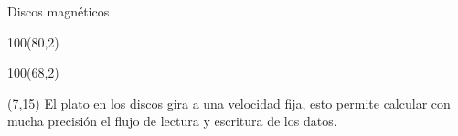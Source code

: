 \documentclass[aspectratio=169]{beamer}
\begin{document}
\begin{frame}{Discos magnéticos}
    \begin{textblock}{100}(80,2)
    \end{textblock}
    \begin{textblock}{100}(68,2)
    \end{textblock}
    \begin{textblock}{70}(7,15)
    \small
    El plato en los discos gira a una velocidad fija, esto permite calcular con mucha precisión el flujo de lectura y escritura de los datos.\\
    \bigskip

\end{textblock}
\end{frame}
\end{document}

